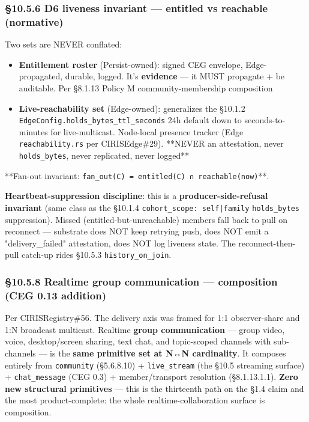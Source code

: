 \documentclass[11pt]{article}
\begin{document}
\subsubsection*{§10.5.6 D6 liveness invariant — entitled vs reachable (normative)}


Two sets are NEVER conflated:


\begin{itemize}\setlength\itemsep{0pt}
\item \textbf{Entitlement roster} (Persist-owned): signed CEG envelope, Edge-propagated, durable, logged. It's \textbf{evidence} — it MUST propagate + be auditable. Per §8.1.13 Policy M community-membership composition
\item \textbf{Live-reachability set} (Edge-owned): generalizes the §10.1.2 \texttt{EdgeConfig.holds\_bytes\_ttl\_seconds} 24h default down to seconds-to-minutes for live-multicast. Node-local presence tracker (Edge \texttt{reachability.rs} per CIRISEdge\#29). **NEVER an attestation, never \texttt{holds\_bytes}, never replicated, never logged**
\end{itemize}


**Fan-out invariant: \texttt{fan\_out(C) = entitled(C) ∩ reachable(now)}**.


\textbf{Heartbeat-suppression discipline}: this is a \textbf{producer-side-refusal invariant} (same class as the §10.1.4 \texttt{cohort\_scope: self|family} \texttt{holds\_bytes} suppression). Missed (entitled-but-unreachable) members fall back to pull on reconnect — substrate does NOT keep retrying push, does NOT emit a "delivery\_failed" attestation, does NOT log liveness state. The reconnect-then-pull catch-up rides §10.5.3 \texttt{history\_on\_join}.


\subsubsection*{§10.5.8 Realtime group communication — composition (CEG 0.13 addition)}


Per CIRISRegistry\#56. The delivery axis was framed for 1:1 observer-share and 1:N broadcast multicast. Realtime \textbf{group communication} — group video, voice, desktop/screen sharing, text chat, and topic-scoped channels with sub-channels — is the \textbf{same primitive set at N↔N cardinality}. It composes entirely from \texttt{community} (§5.6.8.10) + \texttt{live\_stream} (the §10.5 streaming surface) + \texttt{chat\_message} (CEG 0.3) + member/transport resolution (§8.1.13.1.1). \textbf{Zero new structural primitives} — this is the thirteenth path on the §1.4 claim and the most product-complete: the whole realtime-collaboration surface is composition.
\end{document}
